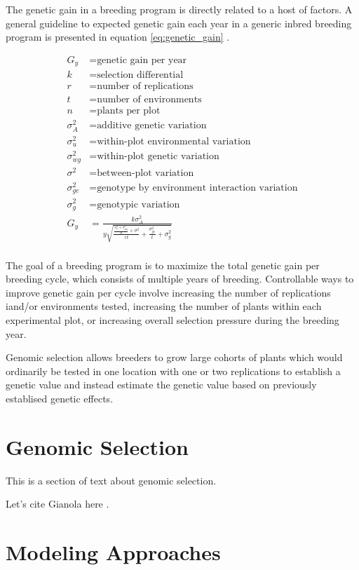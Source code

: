 The genetic gain in a breeding program is directly related to a host of factors. A 
general guideline to expected genetic gain each year in a generic inbred breeding 
program is presented in equation \ref{eq:genetic_gain} \citep{fehr1987}.

\begin{equation} \label{eq:genetic_gain}
\begin{split}
    G_y           &= \textrm{genetic gain per year} \\
    k             &= \textrm{selection differential} \\
    r             &= \textrm{number of replications} \\
    t             &= \textrm{number of environments} \\
    n             &= \textrm{plants per plot} \\
    \sigma^2_{A}  &= \textrm{additive genetic variation} \\
    \sigma^2_{u}  &= \textrm{within-plot environmental variation} \\
    \sigma^2_{wg} &= \textrm{within-plot genetic variation} \\
    \sigma^2      &= \textrm{between-plot variation} \\
    \sigma^2_{ge} &= \textrm{genotype by environment interaction variation} \\
    \sigma^2_{g}  &= \textrm{genotypic variation} \\
    G_y           &= \frac{k\sigma^2_A}{y \sqrt{ \frac{\frac{\sigma^2_{u} + \sigma^2_{wg}}{n} + \sigma^2}{rt} + \frac{\sigma^2_{ge}}{t} + \sigma^2_{g} }} \\
\end{split}
\end{equation}

The goal of a breeding program is to maximize the total genetic gain per breeding cycle, 
which consists of multiple years of breeding. Controllable ways to improve genetic gain 
per cycle involve increasing the number of replications iand/or environments tested,
increasing the number of plants within each experimental plot, or increasing overall selection pressure
during the breeding year.

Genomic selection allows breeders to grow large cohorts of plants which would ordinarily be 
tested in one location with one or two replications to establish a genetic value and instead 
estimate the genetic value based on previously establised genetic effects. 


\section{Genomic Selection}
This is a section of text about genomic selection. 

Let's cite Gianola here \citep{gianola2006}.

\blindtext


\section{Modeling Approaches}
\blindenumerate
\blindtext
